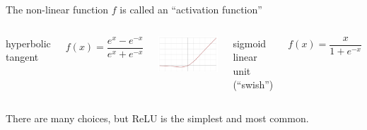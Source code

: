 \documentclass[aspectratio=169]{beamer}
\begin{document}
\begin{frame}{The non-linear function $f$ is called an ``activation function''}
\begin{columns}
hyperbolic tangent

\vspace{-\baselineskip}
\[ f(x) = \frac{e^x - e^{-x}}{e^x + e^{-x}} \]

\includegraphics[width=\linewidth]{Activation_swish.pdf}

sigmoid linear unit (``swish'')

\[ f(x) = \frac{x}{1 + e^{-x}} \]
\end{columns}

\large

\vspace{0.75 cm}
There are many choices, but ReLU is the simplest and most common.
\end{frame}
\end{document}
